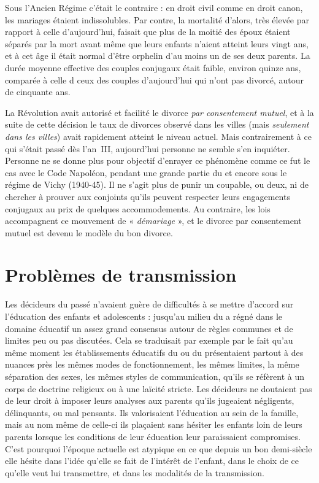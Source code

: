 \begin{table}[t]
\begin{table}[t]
 Sous l'Ancien Régime c'était le contraire : en droit civil comme en droit canon, les mariages étaient indissolubles. Par contre, la mortalité d'alors, très élevée par rapport à celle d'aujourd'hui, faisait que plus de la moitié des époux étaient séparés par la mort avant même que leurs enfants n'aient atteint leurs vingt ans, et à cet âge il était normal d'être orphelin d'au moins un de ses deux parents. La durée moyenne effective des couples conjugaux était faible, environ quinze ans, comparée à celle d ceux des couples d'aujourd'hui qui n'ont pas divorcé, autour de cinquante ans. 

 La Révolution avait autorisé et facilité le divorce \emph{par consentement mutuel}, et à la suite de cette décision le taux de divorces observé dans les villes (mais \emph{seulement dans les villes}) avait rapidement atteint le niveau actuel. Mais contrairement à ce qui s'était passé dès l'an~III, aujourd'hui personne ne semble s'en inquiéter. Personne ne se donne plus pour objectif d'enrayer ce phénomène comme ce fut le cas avec le Code Napoléon, pendant une grande partie du  et encore sous le régime de Vichy (1940-45). Il ne s'agit plus de punir un coupable, ou deux, ni de chercher à prouver aux conjoints qu'ils peuvent respecter leurs engagements conjugaux au prix de quelques accommodements. Au contraire, les lois accompagnent ce mouvement de « \emph{démariage} », et le divorce par consentement mutuel est devenu le modèle du bon divorce. 

 


 


 
\section{Problèmes de transmission}


 Les décideurs du passé n'avaient guère de difficultés à se mettre d'accord sur l'éducation des enfants et adolescents : jusqu'au milieu du  a régné dans le domaine éducatif un assez grand consensus autour de règles communes et de limites peu ou pas discutées. Cela se traduisait par exemple par le fait qu'au même moment les établissements éducatifs du  ou du  présentaient partout à des nuances près les mêmes modes de fonctionnement, les mêmes limites, la même séparation des sexes, les mêmes styles de communication, qu'ils se réfèrent à un corps de doctrine religieux ou à une laïcité stricte. Les décideurs ne doutaient pas de leur droit à imposer leurs analyses aux parents qu'ils jugeaient négligents, délinquants, ou mal pensants. Ils valorisaient l'éducation au sein de la famille, mais au nom même de celle-ci ils plaçaient sans hésiter les enfants loin de leurs parents lorsque les conditions de leur éducation leur paraissaient compromises. C'est pourquoi l'époque actuelle est atypique en ce que depuis un bon demi-siècle elle hésite dans l'idée qu'elle se fait de l'intérêt de l'enfant, dans le choix de ce qu'elle veut lui transmettre, et dans les modalités de la transmission. 


\end{table}
\end{table}
